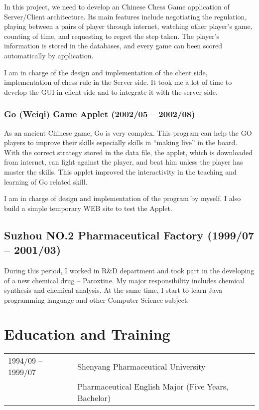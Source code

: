 \documentclass[a4paper,12pt]{article}
\begin{document}
In this project, we need to develop an Chinese Chess Game application of Server/Client architecture. Its main features include negotiating the regulation, playing between a pairs of player through internet, watching other player's game, counting of time, and requesting to regret the step taken. The player's information is stored in the databases, and every game can been scored automatically by application. 

I am in charge of the design and implementation of the client side, implementation of chess rule in the Server side. It took me a lot of time to develop the GUI in client side and to integrate it with the server side. 

\subsubsection{  Go (Weiqi) Game Applet (2002/05 -- 2002/08)}

As an ancient Chinese game, Go is very complex. This program can help the
GO players to improve their skills especially skills in ``making live'' in the board. With
the correct strategy stored in the data file, the applet, which is downloaded from internet, can fight against the player, and beat him unless the player has master the skills. This applet improved the interactivity in the teaching and learning of Go related skill. 

I am in charge of design and implementation of the program by myself. I also build a simple  temporary WEB site to test the Applet. 

\subsection{ Suzhou NO.2 Pharmaceutical Factory (1999/07 -- 2001/03)}
During this period, I worked in R\&D department and took part in the developing of a new chemical drug -- Paroxtine. My major responsibility includes chemical synthesis and chemical analysis. At the same time, I start to learn Java programming language and other Computer Science subject. 
    






\section{Education and Training }
\begin{tabular}{ll}
1994/09 -- 1999/07      & Shenyang Pharmaceutical University\\
                        & Pharmaceutical English Major (Five Years, Bachelor)\\
\end{tabular}
\end{document}
